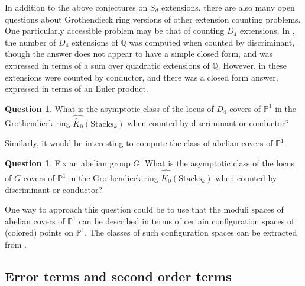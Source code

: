 \documentclass[12 pt]{amsart}
\theoremstyle{plain}
\theoremstyle{definition}
\newtheorem{question}[theorem]{Question}
\theoremstyle{remark}
\numberwithin{equation}{section}
\newcommand\grcSpaces{\widehat{\widetilde{K_0}}(\mathrm{Spaces}_k)} %
\newcommand\grcStacks{\widehat{\widetilde{K_0}}(\mathrm{Stacks}_k)} %
\begin{document}
In addition to the above conjectures on $S_d$ extensions,
there are also many open questions about Grothendieck ring versions of
other extension counting problems.
One particularly accessible problem may be that of counting $D_4$ extensions.
In \cite[Corollary 1.4]{Cohen2002}, the number of $D_4$ extensions of $\mathbb Q$ was computed
when counted by discriminant, though the answer does not appear to have a simple
closed form, and was expressed in terms of a sum over quadratic extensions of
$\mathbb Q$.
However, in \cite[Theorem 1]{altugSVW:the-number-of-quartic-d4-fields-ordered-by-conductor}
these extensions were counted by conductor, and there was a closed form answer,
expressed in terms of an Euler product.
\begin{question}
	\label{question:}
	What is the asymptotic class of the locus of $D_4$ covers of $\mathbb P^1$ in the
	Grothendieck ring $\grcStacks$ when counted by discriminant or conductor?
\end{question}

Similarly, it would be interesting to compute the class of abelian covers of
$\mathbb P^1$.
\begin{question}
	\label{question:}
	Fix an abelian group $G$. What is the asymptotic class of the locus of $G$ covers
	of $\mathbb P^1$ in the Grothendieck ring $\grcStacks$ when counted by
	discriminant or conductor?
\end{question}
One way to approach this question could be to use that
the moduli spaces of abelian covers of $\mathbb P^1$ can be described
in terms of certain configuration spaces of (colored) points on $\mathbb P^1$.
The classes of such configuration spaces can be extracted from
\cite[\S5]{Vakil2015}.


\subsection{Error terms and second order terms}
\end{document}
